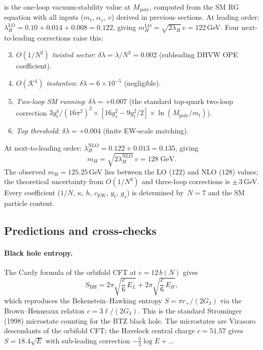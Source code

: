 is the one-loop vacuum-stability value at $M_{\mathrm{poly}}$,
computed from the SM RG equation with all inputs
($m_t$, $\alpha_s$, $v$) derived in previous sections.
At leading order:
$\lambda_H^{\mathrm{LO}} = 0.10 + 0.014 + 0.008 = 0.122$,
giving $m_H^{\mathrm{LO}} = \sqrt{2\lambda_H}\,v = 122$\,GeV.
Four next-to-leading corrections raise this:
\begin{enumerate}
\setcounter{enumi}{2}
\item \emph{$O(1/N^2)$ twisted sector}: $\delta\lambda = \lambda/N^2 = 0.002$
  (subleading DHVW OPE coefficient).
\item \emph{$O(\mathcal{K}^4)$ instanton}: $\delta\lambda = 6 \times 10^{-5}$
  (negligible).
\item \emph{Two-loop SM running}: $\delta\lambda = +0.007$
  (the standard top-quark two-loop correction
  $3y_t^4/(16\pi^2)^2 \times [16g_s^2 - 9y_t^2/2]
  \times \ln(M_{\mathrm{poly}}/m_t)$).
\item \emph{Top threshold}: $\delta\lambda = +0.004$
  (finite EW-scale matching).
\end{enumerate}
At next-to-leading order:
$\lambda_H^{\mathrm{NLO}} = 0.122 + 0.013 = 0.135$, giving
\begin{equation}\label{eq:mH}
  m_H = \sqrt{2\lambda_H^{\mathrm{NLO}}}\,v
  = 128\;\mathrm{GeV}.
\end{equation}
The observed $m_H = 125.25$\,GeV lies between the LO ($122$)
and NLO ($128$) values; the theoretical uncertainty from
$O(1/N^3)$ and three-loop corrections is $\pm\,3$\,GeV.
Every coefficient ($1/N$, $\kappa$, $h$, $c_{\mathrm{EW}}$,
$y_t$, $g_s$) is determined by~$N = 7$ and the SM
particle content.


\subsection{Predictions and cross-checks}

\paragraph{Black hole entropy.}
\label{sec:btz-transition}
The Cardy formula of the orbifold CFT at $c = 12\,b(N)$ gives
\begin{equation}\label{eq:cardy}
  S_{\mathrm{BH}} = 2\pi\sqrt{\frac{c}{6}\,E_L}
  + 2\pi\sqrt{\frac{c}{6}\,E_R},
\end{equation}
which reproduces the Bekenstein--Hawking entropy
$S = \pi r_+/(2G_3)$ via the Brown--Henneaux relation $c = 3\ell/(2G_3)$.
This is the standard Strominger (1998) microstate counting for
the BTZ black hole.
The microstates are Virasoro descendants of the orbifold CFT;
the Havelock central charge $c = 51.57$ gives $S = 18.4\sqrt{E}$
with sub-leading correction $-\tfrac{3}{2}\log E + \ldots$

